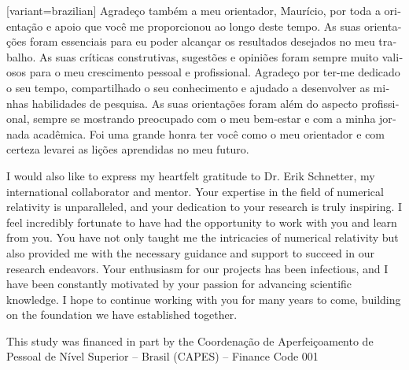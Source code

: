 \documentclass[12pt, twoside]{report}
\begin{document}
\begin{portuguese}[variant=brazilian]
  Agradeço também a meu orientador, Maurício, por toda a orientação e apoio que você me proporcionou ao longo deste tempo. As suas orientações foram essenciais para eu poder alcançar os resultados desejados no meu trabalho. As suas críticas construtivas, sugestões e opiniões foram sempre muito valiosos para o meu crescimento pessoal e profissional. Agradeço por ter-me dedicado o seu tempo, compartilhado o seu conhecimento e ajudado a desenvolver as minhas habilidades de pesquisa. As suas orientações foram além do aspecto profissional, sempre se mostrando preocupado com o meu bem-estar e com a minha jornada acadêmica. Foi uma grande honra ter você como o meu orientador e com certeza levarei as lições aprendidas no meu futuro.
\end{portuguese}

I would also like to express my heartfelt gratitude to Dr. Erik Schnetter, my international collaborator and mentor. Your expertise in the field of numerical relativity is unparalleled, and your dedication to your research is truly inspiring. I feel incredibly fortunate to have had the opportunity to work with you and learn from you. You have not only taught me the intricacies of numerical relativity but also provided me with the necessary guidance and support to succeed in our research endeavors. Your enthusiasm for our projects has been infectious, and I have been constantly motivated by your passion for advancing scientific knowledge. I hope to continue working with you for many years to come, building on the foundation we have established together.

\begin{center}
  {\large{}\thispagestyle{empty}}{\large\par}
  \par\end{center}

\newpage

\begin{center}
  {\large{}\thispagestyle{empty}}{\large\par}
  \par\end{center}

\newpage


\begin{center}
  This study was financed in part by the Coordenação de Aperfeiçoamento de Pessoal de Nível Superior – Brasil (CAPES) – Finance Code 001
\end{center}
\end{document}
